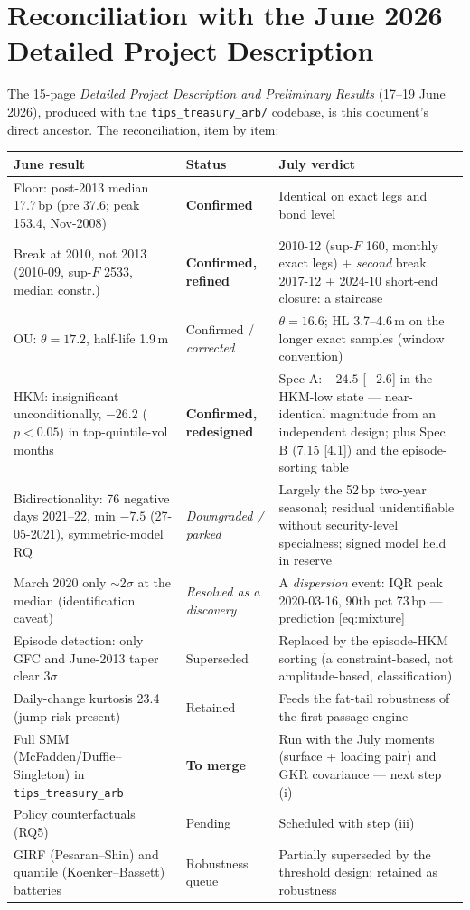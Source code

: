 \documentclass[11pt]{article}
\begin{document}
\appendix

\section{Reconciliation with the June 2026 Detailed Project Description}

The 15-page \emph{Detailed Project Description and Preliminary Results} (17--19 June 2026), produced with the \texttt{tips\_treasury\_arb/} codebase, is this document's direct ancestor. The reconciliation, item by item:

\begin{table}[h!]
\centering\small
\setlength{\tabcolsep}{3.5pt}\begin{tabular}{p{5.3cm}p{3.1cm}p{5.5cm}}
\toprule
June result & Status & July verdict \\
\midrule
Floor: post-2013 median 17.7\,bp (pre 37.6; peak 153.4, Nov-2008) & \textbf{Confirmed} & Identical on exact legs and bond level \\
Break at 2010, not 2013 (2010-09, sup-$F$ 2533, median constr.) & \textbf{Confirmed, refined} & 2010-12 (sup-$F$ 160, monthly exact legs) + \emph{second} break 2017-12 + 2024-10 short-end closure: a staircase \\
OU: $\theta=17.2$, half-life 1.9\,m & Confirmed / \emph{corrected} & $\theta=16.6$; HL 3.7--4.6\,m on the longer exact samples (window convention) \\
HKM: insignificant unconditionally, $-26.2$ ($p<0.05$) in top-quintile-vol months & \textbf{Confirmed, redesigned} & Spec A: $-24.5$ [$-2.6$] in the HKM-low state --- near-identical magnitude from an independent design; plus Spec B (7.15 [4.1]) and the episode-sorting table \\
Bidirectionality: 76 negative days 2021--22, min $-7.5$ (27-05-2021), symmetric-model RQ & \emph{Downgraded / parked} & Largely the 52\,bp two-year seasonal; residual unidentifiable without security-level specialness; signed model held in reserve \\
March 2020 only $\sim$2$\sigma$ at the median (identification caveat) & \emph{Resolved as a discovery} & A \emph{dispersion} event: IQR peak 2020-03-16, 90th pct 73\,bp --- prediction \eqref{eq:mixture} \\
Episode detection: only GFC and June-2013 taper clear 3$\sigma$ & Superseded & Replaced by the episode-HKM sorting (a constraint-based, not amplitude-based, classification) \\
Daily-change kurtosis 23.4 (jump risk present) & Retained & Feeds the fat-tail robustness of the first-passage engine \\
Full SMM (McFadden/Duffie--Singleton) in \texttt{tips\_treasury\_arb} & \textbf{To merge} & Run with the July moments (surface + loading pair) and GKR covariance --- next step (i) \\
Policy counterfactuals (RQ5) & Pending & Scheduled with step (iii) \\
GIRF (Pesaran--Shin) and quantile (Koenker--Bassett) batteries & Robustness queue & Partially superseded by the threshold design; retained as robustness \\
\bottomrule
\end{tabular}
\end{table}
\end{document}
